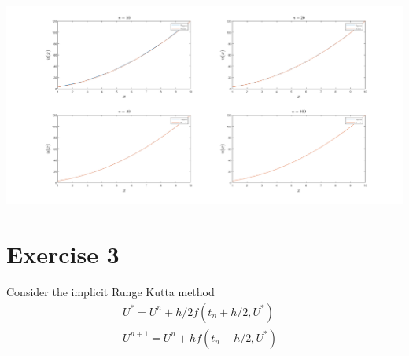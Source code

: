 \documentclass{article}
\begin{document}
\includegraphics[scale = 0.35]{milneplots.png}
\newline

\section*{Exercise 3}
Consider the implicit Runge Kutta method
\begin{align*}
    U^* = U^n + h/2f(t_n + h/2, U^*)& \\
    U^{n+1} = U^n + hf(t_n + h/2, U^*)& \\
\end{align*}
\end{document}
